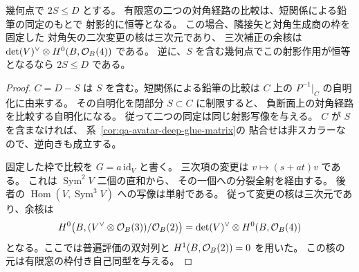 \begin{proposition}[重複負断面における三次関係の余核]
\label{prop:qa-avatar-double-negative-quotient}
幾何点で $2S\leq D$ とする。
有限窓の二つの対角経路の比較は、短関係による鉛筆の同定のもとで
射影的に恒等となる。
この場合、隣接矢と対角生成商の枠を固定した
対角矢の二次変更の核は三次元であり、
三次補正の余核は $\det(V)^\vee\otimes H^0(B,\mathcal O_B(4))$ である。
逆に、$S$ を含む幾何点でこの射影作用が恒等となるなら
$2S\leq D$ である。
\end{proposition}
\begin{proof}
$C=D-S$ は $S$ を含む。短関係による鉛筆の比較は
$C$ 上の $P^{-1}|_C$ の自明化に由来する。
その自明化を閉部分 $S\subset C$ に制限すると、
負断面上の対角経路を比較する自明化になる。
従って二つの同定は同じ射影写像を与える。
$C$ が $S$ を含まなければ、
系~\ref{cor:qa-avatar-deep-glue-matrix}の
貼合せは非スカラーなので、逆向きも成立する。

固定した枠で比較を $G=a\,\mathrm{id}_V$ と書く。
三次項の変更は $v\mapsto(s+at)v$ である。
これは $\operatorname{Sym}^2V$ 二個の直和から、
その一個への分裂全射を経由する。
後者の $\operatorname{Hom}(V,\operatorname{Sym}^3V)$ への写像は単射である。
従って変更の核は三次元であり、余核は
\[
 H^0\bigl(B,(V^\vee\otimes\mathcal O_B(3))/\mathcal O_B(2)\bigr)
    =\det(V)^\vee\otimes H^0(B,\mathcal O_B(4))
\]
となる。ここでは普遍評価の双対列と
$H^1(B,\mathcal O_B(2))=0$ を用いた。
この核の元は有限窓の枠付き自己同型を与える。
\end{proof}

